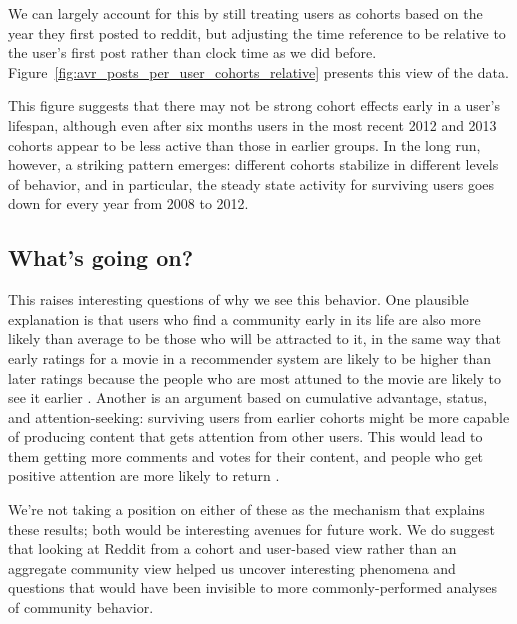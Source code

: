 We can largely account for this by still treating users as cohorts based on the year they first posted to reddit, but adjusting the time reference to be relative to the user's first post rather than clock time as we did before.  Figure~\ref{fig:avr_posts_per_user_cohorts_relative} presents this view of the data.

This figure suggests that there may not be strong cohort effects early in a user's lifespan, although even after six months users in the most recent 2012 and 2013 cohorts appear to be less active than those in earlier groups.  In the long run, however, a striking pattern emerges: different cohorts stabilize in different levels of behavior, and in particular, the steady state activity for surviving users goes down for every year from 2008 to 2012.  

\subsection{What's going on?}
This raises interesting questions of why we see this behavior.  One plausible explanation is that users who find a community early in its life are also more likely than average to be those who will be attracted to it, in the same way that early ratings for a movie in a recommender system are likely to be higher than later ratings because the people who are most attuned to the movie are likely to see it earlier \cite{if_we_can_find_one}.  Another is an argument based on cumulative advantage, status, and attention-seeking: surviving users from earlier cohorts might be more capable of producing content that gets attention from other users.  This would lead to them getting more comments and votes for their content, and people who get positive attention are more likely to return \cite{joyce-kraut, wikipedia, everything2_papers}.  

We're not taking a position on either of these as the mechanism that explains these results; both would be interesting avenues for future work.  We do suggest that looking at Reddit from a cohort and user-based view rather than an aggregate community view helped us uncover interesting phenomena and questions that would have been invisible to more commonly-performed analyses of community behavior. 

